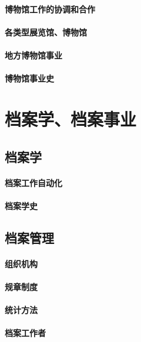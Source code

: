 \documentclass[UTF8]{../../ApplicationUniverse}
\begin{document}
\subsubsection{博物馆工作的协调和合作}
\subsubsection{各类型展览馆、博物馆}
\subsubsection{地方博物馆事业}
\subsubsection{博物馆事业史}
 






\chapter{档案学、档案事业}
\section{档案学}
    \subsubsection{档案工作自动化}
    \subsubsection{档案学史}
\section{档案管理}
    \subsubsection{组织机构}
    \subsubsection{规章制度}
    \subsubsection{统计方法}
    \subsubsection{档案工作者}
\end{document}
